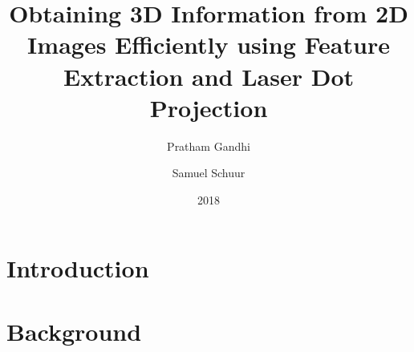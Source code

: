 \documentclass{ro}
\begin{document}
\title{Obtaining 3D Information from 2D Images Efficiently using Feature Extraction and Laser Dot Projection}
%
\author{Pratham Gandhi}
\author{Samuel Schuur}
%
\date{2018}
%

\begin{abstract} 

\end{abstract}

\maketitle

\pagebreak

\section{Introduction}


\section{Background}




\end{document}
